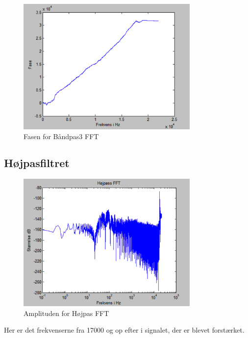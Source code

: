\begin{figure}[H]
	\centering
	\includegraphics[width=0.8\textwidth]{Figur/Snip20151111_81}
	\caption{Fasen for Båndpas3 FFT}
\end{figure}

\subsection{Højpasfiltret}

\begin{figure}[H]
	\centering
	\includegraphics[width=0.8\textwidth]{Figur/Snip20151111_82}
	\caption{Amplituden for Højpas FFT}
\end{figure}

Her er det frekvenserne fra 17000 og op efter i signalet, der er blevet forstærket. 

